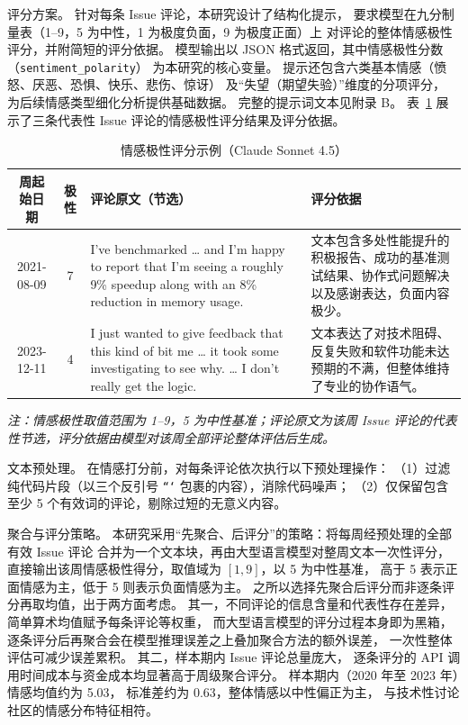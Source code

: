 评分方案。
针对每条 Issue 评论，本研究设计了结构化提示，
要求模型在九分制量表（1--9，5 为中性，1 为极度负面，9 为极度正面）上
对评论的整体情感极性评分，并附简短的评分依据。
模型输出以 JSON 格式返回，其中情感极性分数（\texttt{sentiment\_polarity}）
为本研究的核心变量。
提示还包含六类基本情感（愤怒、厌恶、恐惧、快乐、悲伤、惊讶）
及“失望（期望失验）”维度的分项评分，
为后续情感类型细化分析提供基础数据。
完整的提示词文本见附录 B。
表~\ref{tab:sentiment-example} 展示了三条代表性 Issue 评论的情感极性评分结果及评分依据。

\begin{table}[htbp]
    \centering
    \caption{情感极性评分示例（Claude Sonnet 4.5）}
    \label{tab:sentiment-example}
    \small
    \begin{tabularx}{\textwidth}{c c >{\raggedright\arraybackslash}X >{\raggedright\arraybackslash}X}
        \toprule
        周起始日期 & 极性 & 评论原文（节选） & 评分依据 \\
        \midrule
        2021-08-09 & 7 &
        I've benchmarked \ldots{} and I'm happy to report that I'm seeing a roughly 9\% speedup along with an 8\% reduction in memory usage. &
        文本包含多处性能提升的积极报告、成功的基准测试结果、协作式问题解决以及感谢表达，负面内容极少。 \\
        \midrule
        2023-12-11 & 4 &
        I just wanted to give feedback that this kind of bit me \ldots{} it took some investigating to see why. \ldots{} I don't really get the logic. &
        文本表达了对技术阻碍、反复失败和软件功能未达预期的不满，但整体维持了专业的协作语气。 \\
        \bottomrule
    \end{tabularx}
    \par\vspace{4pt}
    {\small\textit{注：情感极性取值范围为 1--9，5 为中性基准；评论原文为该周 Issue 评论的代表性节选，评分依据由模型对该周全部评论整体评估后生成。}}
\end{table}

文本预处理。
在情感打分前，对每条评论依次执行以下预处理操作：
（1）过滤纯代码片段（以三个反引号 \texttt{```} 包裹的内容），消除代码噪声；
（2）仅保留包含至少 5 个有效词的评论，剔除过短的无意义内容。

聚合与评分策略。
本研究采用“先聚合、后评分”的策略：将每周经预处理的全部有效 Issue 评论
合并为一个文本块，再由大型语言模型对整周文本一次性评分，
直接输出该周情感极性得分，取值域为 $[1, 9]$，以 5 为中性基准，
高于 5 表示正面情感为主，低于 5 则表示负面情感为主。
之所以选择先聚合后评分而非逐条评分再取均值，出于两方面考虑。
其一，不同评论的信息含量和代表性存在差异，
简单算术均值赋予每条评论等权重，
而大型语言模型的评分过程本身即为黑箱，
逐条评分后再聚合会在模型推理误差之上叠加聚合方法的额外误差，
一次性整体评估可减少误差累积。
其二，样本期内 Issue 评论总量庞大，
逐条评分的 API 调用时间成本与资金成本均显著高于周级聚合评分。
样本期内（2020 年至 2023 年）情感均值约为 5.03，
标准差约为 0.63，整体情感以中性偏正为主，
与技术性讨论社区的情感分布特征相符。

